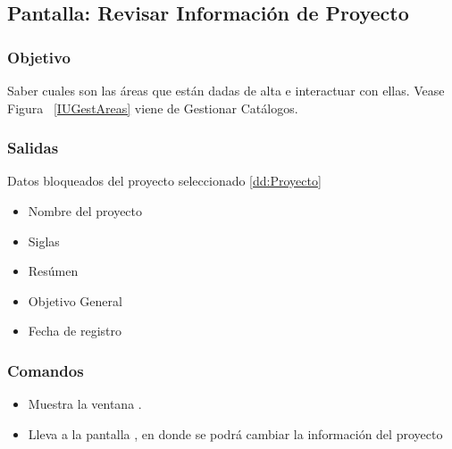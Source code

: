 \subsection{Pantalla: Revisar Información de Proyecto}
\subsubsection{Objetivo}
Saber cuales son las áreas que están dadas de alta e interactuar con ellas. Vease Figura ~\ref{IUGestAreas} viene de Gestionar Catálogos.


\subsubsection{Salidas}
Datos bloqueados del proyecto seleccionado \ref{dd:Proyecto}
\begin{itemize}
\item Nombre del proyecto
\item Siglas
\item Resúmen
\item Objetivo General
\item Fecha de registro
\end{itemize}

\subsubsection{Comandos}
\begin{itemize}
 \item {} Muestra la ventana .
 \item {} Lleva a la pantalla , en donde se podrá cambiar la información del proyecto

\end{itemize}


